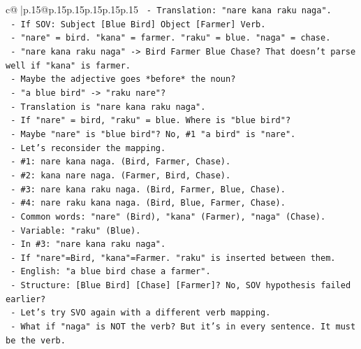 \documentclass{article}
\begin{document}
{\begin{supertabular}{c@{$\;$}|p{.15\linewidth}@{}p{.15\linewidth}p{.15\linewidth}p{.15\linewidth}p{.15\linewidth}p{.15\linewidth}}
{{{\texttt{           {-} Translation: "nare kana raku naga".} \\
\texttt{           {-} If SOV: Subject {[}Blue Bird{]} Object {[}Farmer{]} Verb.} \\
\texttt{           {-} "nare" = bird. "kana" = farmer. "raku" = blue. "naga" = chase.} \\
\texttt{           {-} "nare kana raku naga" {-}> Bird Farmer Blue Chase? That doesn't parse well if "kana" is farmer.} \\
\texttt{           {-} Maybe the adjective goes *before* the noun?} \\
\texttt{             {-} "a blue bird" {-}> "raku nare"?} \\
\texttt{             {-} Translation is "nare kana raku naga".} \\
\texttt{             {-} If "nare" = bird, "raku" = blue. Where is "blue bird"?} \\
\texttt{             {-} Maybe "nare" is "blue bird"? No, \#1 "a bird" is "nare".} \\
\texttt{             {-} Let's reconsider the mapping.} \\
\texttt{             {-} \#1: nare kana naga. (Bird, Farmer, Chase).} \\
\texttt{             {-} \#2: kana nare naga. (Farmer, Bird, Chase).} \\
\texttt{             {-} \#3: nare kana raku naga. (Bird, Farmer, Blue, Chase).} \\
\texttt{             {-} \#4: nare raku kana naga. (Bird, Blue, Farmer, Chase).} \\
\texttt{             {-} Common words: "nare" (Bird), "kana" (Farmer), "naga" (Chase).} \\
\texttt{             {-} Variable: "raku" (Blue).} \\
\texttt{             {-} In \#3: "nare kana raku naga".} \\
\texttt{               {-} If "nare"=Bird, "kana"=Farmer. "raku" is inserted between them.} \\
\texttt{               {-} English: "a blue bird chase a farmer".} \\
\texttt{               {-} Structure: {[}Blue Bird{]} {[}Chase{]} {[}Farmer{]}? No, SOV hypothesis failed earlier?} \\
\texttt{               {-} Let's try SVO again with a different verb mapping.} \\
\texttt{               {-} What if "naga" is NOT the verb? But it's in every sentence. It must be the verb.} \\
}}}
\end{supertabular}}
\end{document}

